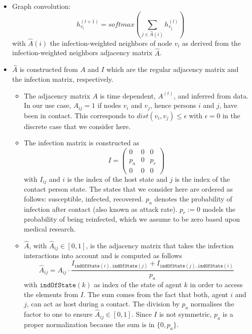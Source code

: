 \documentclass[]{article}
\newcommand{\indexOfState}[1]{\texttt{indOfState}(#1)}
\begin{document}
\begin{itemize}
	\item Graph convolution:
	\begin{equation}
		h_{v_i}^{(l+1)} = softmax(\sum_{j\in \hat{A}(i)} h_{v_j}^{(l)})
	\end{equation}
	with $\hat{A}(i)$ the infection-weighted neighbors of node $v_i$ as derived from the infection-weighted neighbors adjacency matrix $\hat{A}$.
	\item $\hat{A}$ is constructed from $A$ and $I$ which are the regular adjacency matrix and the infection matrix, respectively.
	\begin{itemize}
		\item The adjacency matrix $A$ is time dependent, $A^{(t)}$, and inferred from data. In our use case, $A_{ij}=1$ if nodes $v_i$ and $v_j$, hence persons $i$ and $j$, have been in contact. This corresponds to $dist(v_i, v_j) \le \epsilon$ with $\epsilon=0$ in the discrete case that we consider here.
		\item The infection matrix is constructed as
		\begin{equation}
			I =
			\begin{pmatrix}
				0   &  0  & 0 \\
				p_a &  0  & p_r \\
				0   &  0  & 0
			\end{pmatrix}
		\end{equation}
		with $I_{ij}$ and $i$ is the index of the host state and $j$ is the index of the contact person state. The states that we consider here are ordered as follows: susceptible, infected, recovered. $p_a$ denotes the probability of infection  after contact (also known as attack rate). $p_r := 0$ models the probability of being reinfected, which we assume to be zero based upon medical research.
		\item $\hat{A}$, with $\hat{A}_{ij}\in [0, 1]$, is the adjacency matrix that takes the infection interactions into account and is computed as follows
		\begin{equation}
			\hat{A}_{ij} = A_{ij}\cdot \frac{I_{\indexOfState{i}, \indexOfState{j}} + I_{\indexOfState{j}, \indexOfState{i}}}{p_a}
		\end{equation}
		with $\indexOfState{k}$ as index of the state of agent $k$ in order to access the elements from $I$. The sum comes from the fact that both, agent $i$ and $j$, can act as host during a contact. The division by $p_a$ normalises the factor to one to ensure $\hat{A}_{ij} \in [0, 1]$. Since $I$ is not symmetric, $p_a$ is a proper normalization because the sum is in $\{0, p_a\}$.

\end{itemize}
\end{itemize}
\end{document}
